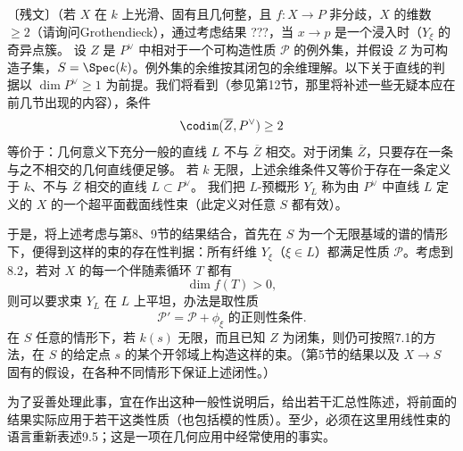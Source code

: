 〔残文〕（若 $X$ 在 $k$ 上光滑、固有且几何整，且 $f:X\to P$ 非分歧，$X$ 的维数 $\ge2$（请询问Grothendieck），通过考虑结果 ???，当 $x\to p$ 是一个浸入时（$Y_\xi$ 的奇异点簇。
设 $Z$ 是 $P^\vee$ 中相对于一个可构造性质 $\mathcal P$ 的例外集，并假设 $Z$ 为可构造子集，$S=\Spec(k)$。例外集的余维按其闭包的余维理解。以下关于直线的判据以 $\dim P^\vee\geq1$ 为前提。我们将看到（参见第12节，那里将补述一些无疑本应在前几节出现的内容），条件
\[
\codim(\overline Z,P^\vee)\geq2
\]
等价于：几何意义下充分一般的直线 $L$ 不与 $\overline Z$ 相交。对于闭集 $\overline Z$，只要存在一条与之不相交的几何直线便足够。
若 $k$ 无限，上述余维条件又等价于存在一条定义于 $k$、不与 $\overline Z$ 相交的直线 $L\subset P^\vee$。
我们把 $L$-预概形 $Y_L$ 称为由 $P^\vee$ 中直线 $L$ 定义的 $X$ 的一个超平面截面线性束（此定义对任意 $S$ 都有效）。

于是，将上述考虑与第8、9节的结果结合，首先在 $S$ 为一个无限基域的谱的情形下，便得到这样的束的存在性判据：所有纤维 $Y_\xi$（$\xi\in L$）都满足性质 $\mathcal P$。考虑到8.2，若对 $X$ 的每一个伴随素循环 $T$ 都有
\[
\dim f(T)>0,
\]
则可以要求束 $Y_L$ 在 $L$ 上平坦，办法是取性质
\[
\mathcal P'=\mathcal P+\text{$\phi_\xi$ 的正则性条件}.
\]
在 $S$ 任意的情形下，若 $k(s)$ 无限，而且已知 $Z$ 为闭集，则仍可按照7.1的方法，在 $S$ 的给定点 $s$ 的某个开邻域上构造这样的束。（第5节的结果以及 $X\to S$ 固有的假设，在各种不同情形下保证上述闭性。）

为了妥善处理此事，宜在作出这种一般性说明后，给出若干汇总性陈述，将前面的结果实际应用于若干这类性质（也包括模的性质）。至少，必须在这里用线性束的语言重新表述9.5；这是一项在几何应用中经常使用的事实。

